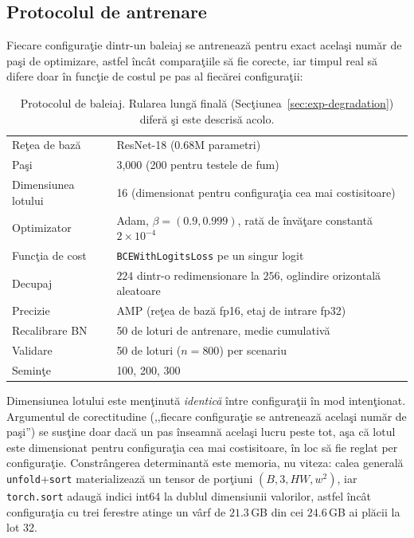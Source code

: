 \subsection{Protocolul de antrenare}

Fiecare configuraţie dintr-un baleiaj se antrenează pentru exact acelaşi număr
de paşi de optimizare, astfel încât comparaţiile să fie corecte, iar timpul real
să difere doar în funcţie de costul pe pas al fiecărei configuraţii:

\begin{table}[h]
  \centering
  \caption{Protocolul de baleiaj. Rularea lungă finală
  (Secţiunea~\ref{sec:exp-degradation}) diferă şi este descrisă acolo.}
  \label{tab:protocol}
  \begin{tabular}{ll}
    \toprule
    Reţea de bază      & ResNet-18 (0.68M parametri) \\
    Paşi               & 3{,}000 (200 pentru testele de fum) \\
    Dimensiunea lotului& 16 (dimensionat pentru configuraţia cea mai costisitoare) \\
    Optimizator        & Adam, $\beta = (0.9, 0.999)$, rată de învăţare constantă $2\times10^{-4}$ \\
    Funcţia de cost    & \texttt{BCEWithLogitsLoss} pe un singur logit \\
    Decupaj            & $224$ dintr-o redimensionare la $256$, oglindire orizontală aleatoare \\
    Precizie           & AMP (reţea de bază fp16, etaj de intrare fp32) \\
    Recalibrare BN     & 50 de loturi de antrenare, medie cumulativă \\
    Validare           & 50 de loturi ($n=800$) per scenariu \\
    Seminţe            & 100, 200, 300 \\
    \bottomrule
  \end{tabular}
\end{table}

Dimensiunea lotului este menţinută \emph{identică} între configuraţii în mod
intenţionat. Argumentul de corectitudine (,,fiecare configuraţie se antrenează
acelaşi număr de paşi'') se susţine doar dacă un pas înseamnă acelaşi lucru
peste tot, aşa că lotul este dimensionat pentru configuraţia cea mai
costisitoare, în loc să fie reglat per configuraţie. Constrângerea determinantă
este memoria, nu viteza: calea generală \texttt{unfold}+\texttt{sort}
materializează un tensor de porţiuni $(B, 3, HW, w^2)$, iar \texttt{torch.sort}
adaugă indici int64 la dublul dimensiunii valorilor, astfel încât configuraţia
cu trei ferestre atinge un vârf de $21.3$\,GB din cei $24.6$\,GB ai plăcii la
lot 32.

